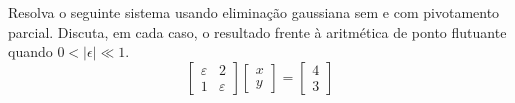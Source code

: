 \begin{ex} Resolva o seguinte sistema usando eliminação gaussiana sem e com pivotamento parcial. Discuta, em cada caso, o resultado frente à aritmética de ponto flutuante quando $0<|\epsilon| \ll 1$.
  \begin{equation}
    \begin{bmatrix}
      \varepsilon & 2\\
      1 & \varepsilon
    \end{bmatrix}
    \begin{bmatrix}
      x\\y
    \end{bmatrix}
    =
    \begin{bmatrix}
      4\\3
    \end{bmatrix}
  \end{equation}
\end{ex}
